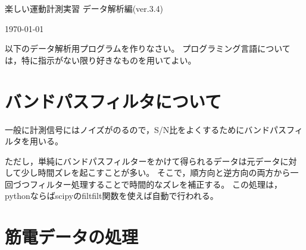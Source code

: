 \documentclass{jsarticle}
\def\version{3.4}
\begin{document}
\begin{center}
  {\LARGE 楽しい運動計測実習 データ解析編(ver.\version)}
\end{center}
\begin{flushright}
\today
\end{flushright}

以下のデータ解析用プログラムを作りなさい。
プログラミング言語については，特に指示がない限り好きなものを用いてよい。


\section{バンドパスフィルタについて}  
一般に計測信号にはノイズがのるので，S/N比をよくするためにバンドパスフィルタを用いる。

ただし，単純にバンドパスフィルターをかけて得られるデータは元データに対して少し時間ズレを起こすことが多い。
そこで，順方向と逆方向の両方から一回づつフィルター処理することで時間的なズレを補正する。
この処理は，pythonならばscipyのfiltfilt関数を使えば自動で行われる。

\section{筋電データの処理}
\end{document}
